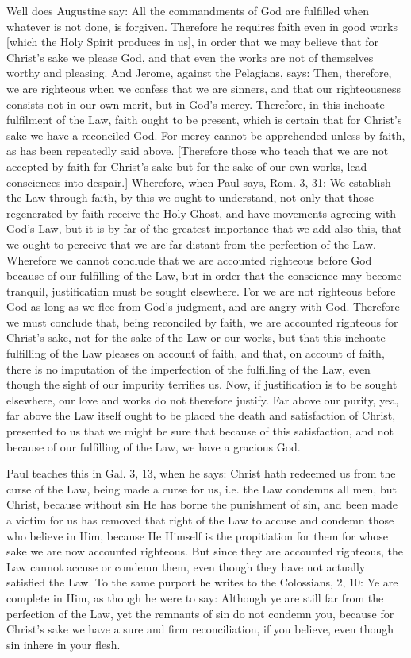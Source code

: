 Well does Augustine say: All the commandments of God are fulfilled
when whatever is not done, is forgiven.  Therefore he requires faith
even in good works [which the Holy Spirit produces in us], in order
that we may believe that for Christ's sake we please God, and that
even the works are not of themselves worthy and pleasing.  And Jerome,
against the Pelagians, says: Then, therefore, we are righteous when
we confess that we are sinners, and that our righteousness consists
not in our own merit, but in God's mercy.  Therefore, in this
inchoate fulfilment of the Law, faith ought to be present, which is
certain that for Christ's sake we have a reconciled God.  For mercy
cannot be apprehended unless by faith, as has been repeatedly said
above.  [Therefore those who teach that we are not accepted by faith
for Christ's sake but for the sake of our own works, lead consciences
into despair.] Wherefore, when Paul says, Rom. 3, 31: We establish
the Law through faith, by this we ought to understand, not only that
those regenerated by faith receive the Holy Ghost, and have movements
agreeing with God's Law, but it is by far of the greatest importance
that we add also this, that we ought to perceive that we are far
distant from the perfection of the Law.  Wherefore we cannot conclude
that we are accounted righteous before God because of our fulfilling
of the Law, but in order that the conscience may become tranquil,
justification must be sought elsewhere.  For we are not righteous
before God as long as we flee from God's judgment, and are angry with
God.  Therefore we must conclude that, being reconciled by faith, we
are accounted righteous for Christ's sake, not for the sake of the
Law or our works, but that this inchoate fulfilling of the Law
pleases on account of faith, and that, on account of faith, there is
no imputation of the imperfection of the fulfilling of the Law, even
though the sight of our impurity terrifies us.  Now, if justification
is to be sought elsewhere, our love and works do not therefore
justify.  Far above our purity, yea, far above the Law itself ought
to be placed the death and satisfaction of Christ, presented to us
that we might be sure that because of this satisfaction, and not
because of our fulfilling of the Law, we have a gracious God.

Paul teaches this in Gal. 3, 13, when he says: Christ hath redeemed
us from the curse of the Law, being made a curse for us, i.e. the Law
condemns all men, but Christ, because without sin He has borne the
punishment of sin, and been made a victim for us has removed that
right of the Law to accuse and condemn those who believe in Him,
because He Himself is the propitiation for them for whose sake we are
now accounted righteous.  But since they are accounted righteous, the
Law cannot accuse or condemn them, even though they have not actually
satisfied the Law.  To the same purport he writes to the Colossians,
2, 10: Ye are complete in Him, as though he were to say: Although ye
are still far from the perfection of the Law, yet the remnants of sin
do not condemn you, because for Christ's sake we have a sure and firm
reconciliation, if you believe, even though sin inhere in your flesh.

